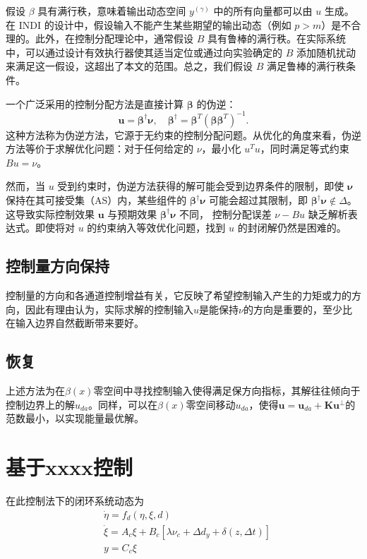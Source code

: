 \begin{ubox}
  假设 $ \beta $ 具有满行秩，意味着输出动态空间 $ y^{(\gamma)} $ 中的所有向量都可以由 $ u $ 生成。在 INDI 的设计中，假设输入不能产生某些期望的输出动态（例如 $p>m$）是不合理的。此外，在控制分配理论中，通常假设 $B$ 具有鲁棒的满行秩。在实际系统中，可以通过设计有效执行器使其适当定位或通过向实验确定的 $B$ 添加随机扰动来满足这一假设，这超出了本文的范围。总之，我们假设 $B$ 满足鲁棒的满行秩条件。
  
  一个广泛采用的控制分配方法是直接计算 $\bm{\beta}$ 的伪逆：
\begin{equation}
  {{\bm{u }}} = {{\bm{\beta}}^\dag }{{\bm{\nu }}},   \quad  {{\bm{\beta}}^\dag } = {{\bm{\beta}}^T}{\left( {{\bm{\beta}}{{\bm{\beta}}^T}} \right)^{ - 1}}.
  \label{eq_32}
\end{equation}
这种方法称为伪逆方法，它源于无约束的控制分配问题。从优化的角度来看，伪逆方法等价于求解优化问题：对于任何给定的 $\nu$，最小化 $u^T u$，同时满足等式约束 $Bu = \nu$。

然而，当 $u$ 受到约束时，伪逆方法获得的解可能会受到边界条件的限制，即使 $\bm{\nu}$ 保持在其可接受集（AS）内，某些组件的 ${{\bm{\beta}}^\dag }{{\bm{\nu }}}$ 可能会超过其限制，即 ${{\bm{\beta}}^\dag }{{\bm{\nu }}} \notin \Delta$。这导致实际控制效果 $\bm{u}$ 与预期效果 ${{\bm{\beta}}^\dag }{{\bm{\nu }}}$ 不同， 控制分配误差 $\nu - Bu$ 缺乏解析表达式。即使将对 $u$ 的约束纳入等效优化问题，找到 $u$ 的封闭解仍然是困难的。

\subsection{控制量方向保持}
控制量的方向和各通道控制增益有关，它反映了希望控制输入产生的力矩或力的方向，因此有理由认为，实际求解的控制输入$u$是能保持$\nu$的方向是重要的，至少比在输入边界自然截断带来要好。

\subsection{恢复}
上述方法为在$\beta(x)$零空间中寻找控制输入使得满足保方向指标，其解往往倾向于控制边界上的解$u_{da}$。同样，可以在$\beta(x)$零空间移动$u_{da}$，使得$\mathbf{u}=\mathbf{u}_{da}+\mathbf{K}\mathbf{u}^{\perp}$的范数最小，以实现能量最优解。


\section{基于xxxx控制}

在此控制法下的闭环系统动态为
\begin{equation} 
  \begin{aligned}
    &\dot{\eta}= f_{d}(\eta,\xi,d)\\
    &\dot{\xi}= A_{c}\xi+B_{c}[\lambda \nu_c+\Delta d_y+\delta(z,\Delta t) ]\\
    &y= C_{c}\xi
  \end{aligned}
  \label{close}
\end{equation}

\end{ubox}
